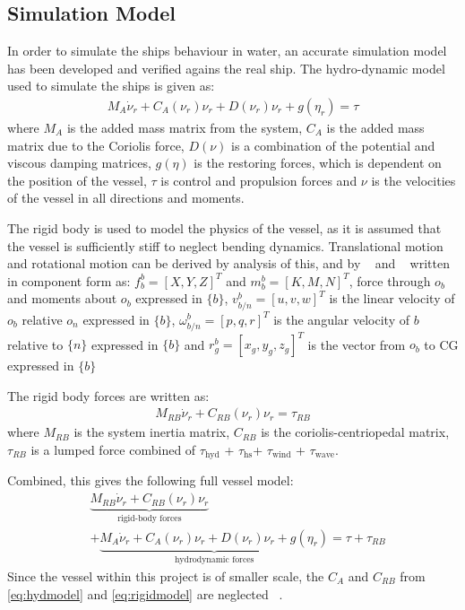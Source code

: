 \documentclass[a4paper,conference]{IEEEtran}
\begin{document}
\subsection{Simulation Model}
\label{ch:simulation-model}
In order to simulate the ships behaviour in water, an accurate
simulation model has been developed and verified agains the real ship.
The hydro-dynamic model used to simulate the ships is given as:
\begin{align}
M_A \dot \nu_r + C_A(\nu_r)\nu_r + D(\nu_r)\nu_r + g(\eta_r) = \tau
\label{eq:hydmodel}
\end{align}
where
$M_A$ is the added mass matrix from the system, $C_A$ is the added mass matrix due to the Coriolis force, $D(\nu)$ is a combination of the potential and viscous damping matrices, $g(\eta)$ is the restoring forces, which is dependent on the position of the vessel, $\tau$ is control and propulsion forces and $\nu$ is the velocities of the vessel in all directions and moments.

The rigid body is used to model the physics of the vessel, as it is
assumed that the vessel is sufficiently stiff to neglect bending
dynamics. Translational motion and rotational motion can be derived by
analysis of this, and by ~\citep{sname1950} and ~\citep[sec.
(3.3.1)]{fossen} written in component form as:
$f^b_b = [X,Y,Z]^T$ and $m^b_b = [K,M,N]^T$, force through $o_b$ and moments about $o_b$ expressed in $\{b\}$,
$v^b_{b/n} = [u,v,w]^T$ is the linear velocity of $o_b$ relative $o_n$ expressed in $\{b\}$,
$\omega^b_{b/n} = [p,q,r]^T$ is the angular velocity of ${b}$ relative to $\{n\}$ expressed in  $\{b\}$ and 
$r^b_g = [x_g,y_g,z_g]^T$ is the vector from $o_b$ to CG expressed in $\{b\}$

The rigid body forces are written as:
\begin{align}
M_{RB} \dot \nu_r + C_{RB}(\nu_r)\nu_r = \tau_{RB}
\label{eq:rigidmodel}
\end{align}
where $M_{RB}$ is the system inertia matrix, $C_{RB}$ is the coriolis-centriopedal matrix, $\tau_{RB}$ is a lumped force combined of $\tau_{\text{hyd}}$ + $\tau_{\text{hs}}$+ $\tau_{\text{wind}}$ + $\tau_{\text{wave}}$.

Combined, this gives the following full vessel model:
\begin{align}
&\underbrace{M_{RB} \dot \nu_r + C_{RB}(\nu_r)\nu_r}_{\text{rigid-body forces}}\\\nonumber
&+ \underbrace{M_A \dot \nu_r + C_A(\nu_r)\nu_r + D(\nu_r)\nu_r + g(\eta_r)}_{\text{hydrodynamic forces}}  = \tau + \tau_{RB}
\label{eq:totmodel}
\end{align}
Since the vessel within this project is of smaller scale, the $C_A$ and $C_{RB}$ from \ref{eq:hydmodel} and \ref{eq:rigidmodel} are neglected ~\citep[eq. (2.23)]{fullactuatship}.
\end{document}
